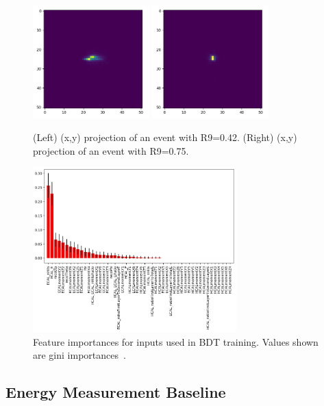 \begin{figure}[htbp]
\centering
\includegraphics[width=0.4\textwidth]{Images/Calo/R9_0p42.png}
\includegraphics[width=0.4\textwidth]{Images/Calo/R9_0p75.png}
\caption{(Left) (x,y) projection of an event with R9=0.42. (Right) (x,y) projection of an event with R9=0.75.}
\label{fig:R9_examples}
\end{figure}

\begin{figure}[htbp]
\centering
\includegraphics[width=0.7\textwidth]{Images/Calo/BDT_ranking_fixed.png}
\caption{Feature importances for inputs used in BDT training. Values shown are gini importances~\cite{Breiman}.\label{fig:BDT_ranking}}
\end{figure}

\subsection*{Energy Measurement Baseline}\label{app:regression_baseline}

